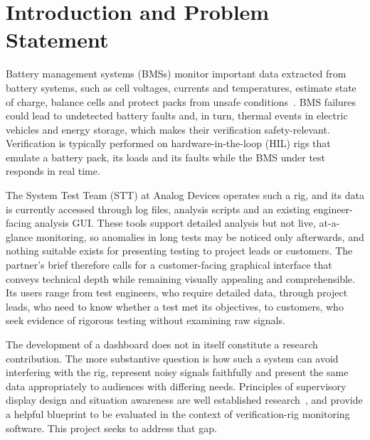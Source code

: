 \section{Introduction and Problem Statement}
\label{sec:intro}

Battery management systems (BMSs) monitor important data extracted from battery systems, such as cell voltages, currents and temperatures, estimate state of charge, balance cells and protect packs from unsafe conditions~\cite{plett2015battery}.
BMS failures could lead to undetected battery faults and, in turn, thermal events in electric vehicles and energy storage, which makes their verification safety-relevant.
Verification is typically performed on hardware-in-the-loop (HIL) rigs that emulate a battery pack, its loads and its faults while the BMS under test responds in real time.

The System Test Team (STT) at Analog Devices operates such a rig, and its data is currently accessed through log files, analysis scripts and an existing engineer-facing analysis GUI.
These tools support detailed analysis but not live, at-a-glance monitoring, so anomalies in long tests may be noticed only afterwards, and nothing suitable exists for presenting testing to project leads or customers.
The partner's brief therefore calls for a customer-facing graphical interface that conveys technical depth while remaining visually appealing and comprehensible.
Its users range from test engineers, who require detailed data, through project leads, who need to know whether a test met its objectives, to customers, who seek evidence of rigorous testing without examining raw signals.

The development of a dashboard does not in itself constitute a research contribution.
The more substantive question is how such a system can avoid interfering with the rig, represent noisy signals faithfully and present the same data appropriately to audiences with differing needs.
Principles of supervisory display design and situation awareness are well established research~\cite{endsley1995toward}, and provide a helpful blueprint to be evaluated in the context of verification-rig monitoring software.
This project seeks to address that gap.
